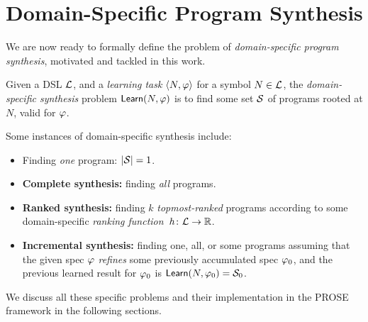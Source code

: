 \section{Domain-Specific Program Synthesis}
\label{sec:background:problem}
We are now ready to formally define the problem of \emph{domain-specific program synthesis}, motivated and tackled in
this work.

\begin{problem}
    \label{problem:syn:general}
    Given a DSL $\mathcal{L}$, and a \emph{learning task} $\langle N, \varphi\rangle$ for a symbol $N \in \mathcal{L}$, the
    \emph{domain\hyp{}specific synthesis} problem $\mathsf{Learn}(N, \varphi)$ is to find some set $\mathcal{S}$ of programs
    rooted at $N$, valid for $\varphi$.

    Some instances of domain-specific synthesis include:
    \begin{itemize}[nosep]
        \item Finding \emph{one} program: $|\mathcal{S}| = 1$.
        \item \textbf{Complete synthesis:} finding \emph{all} programs.
        \item \textbf{Ranked synthesis:} finding $k$ \emph{topmost-ranked} programs according to some domain-specific
            \emph{ranking function}~$h\colon\mathcal{L} \to \mathbb{R}$.
        \item \textbf{Incremental synthesis:} finding one, all, or some programs assuming that the given spec $\varphi$
            \emph{refines} some previously accumulated spec $\varphi_0$, and the previous learned result for $\varphi_0$ is
            $\mathsf{Learn}(N, \varphi_0) = \mathcal{S}_0$.
    \end{itemize}
    We discuss all these specific problems and their implementation in the PROSE framework in the following sections.
\end{problem}

